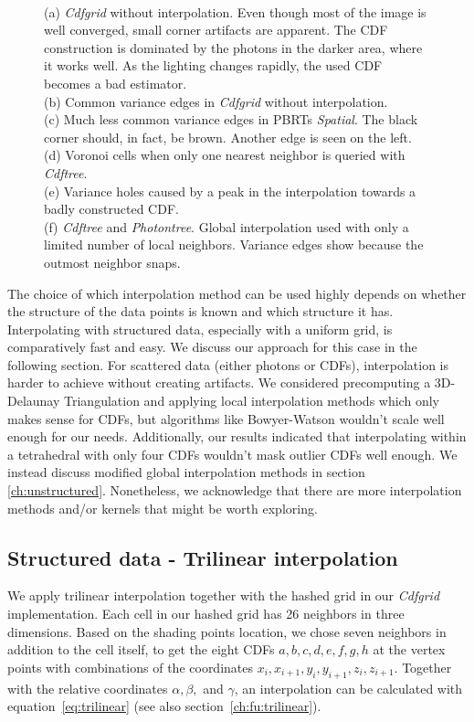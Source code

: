 \begin{figure}
{    \\(a) \textit{Cdfgrid} without interpolation. Even though most of the image is well converged, small corner artifacts are apparent. The CDF construction is dominated by the photons in the darker area, where it works well. As the lighting changes rapidly, the used CDF becomes a bad estimator. 
    \\(b) Common variance edges in \textit{Cdfgrid} without interpolation. 
    \\(c) Much less common variance edges in PBRTs \textit{Spatial}. The black corner should, in fact, be brown. Another edge is seen on the left. 
    \\(d) Voronoi cells when only one nearest neighbor is queried with \textit{Cdftree}. 
    \\(e) Variance holes caused by a peak in the interpolation towards a badly constructed CDF.
    \\(f) \textit{Cdftree} and \textit{Photontree}. Global interpolation used with only a limited number of local neighbors. Variance edges show because the outmost neighbor snaps.
    }
\end{figure}


The choice of which interpolation method can be used highly depends on whether the structure of the data points is known and which structure it has. Interpolating with structured data, especially with a uniform grid, is comparatively fast and easy. We discuss our approach for this case in the following section. For scattered data (either photons or CDFs), interpolation is harder to achieve without creating artifacts. We considered precomputing a 3D-Delaunay Triangulation and applying local interpolation methods which only makes sense for CDFs, but algorithms like Bowyer-Watson wouldn't scale well enough for our needs. Additionally, our results indicated that interpolating within a tetrahedral with only four CDFs wouldn't mask outlier CDFs well enough. We instead discuss modified global interpolation methods in section \ref{ch:unstructured}. Nonetheless, we acknowledge that there are more interpolation methods and/or kernels that might be worth exploring.

\subsection{Structured data - Trilinear interpolation}
\label{ch:trilinear}

We apply trilinear interpolation together with the hashed grid in our \textit{Cdfgrid} implementation. Each cell in our hashed grid has 26 neighbors in three dimensions. Based on the shading points location, we chose seven neighbors in addition to the cell itself, to get the eight CDFs $a,b,c,d,e,f,g,h$ at the vertex points with combinations of the coordinates $x_i, x_{i+1}, y_i, y_{i+1}, z_i, z_{i+1}$. Together with the relative coordinates $\alpha, \beta,$ and $\gamma$, an interpolation can be calculated with equation~\ref{eq:trilinear} (see also section~\ref{ch:fu:trilinear}).

